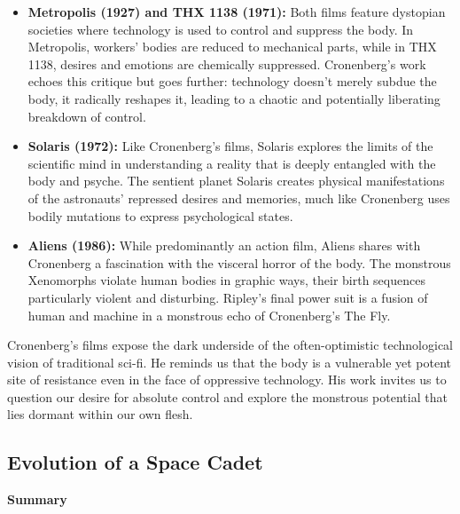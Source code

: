 \documentclass[11pt,fleqn]{book} %
\begin{document}
\begin{itemize}
\item \textbf{Metropolis (1927) and THX 1138 (1971):} Both films feature dystopian societies where technology is used to control and suppress the body. In Metropolis, workers' bodies are reduced to mechanical parts, while in THX 1138, desires and emotions are chemically suppressed. Cronenberg's work echoes this critique but goes further: technology doesn't merely subdue the body, it radically reshapes it, leading to a chaotic and potentially liberating breakdown of control. 

\item \textbf{Solaris (1972):}  Like Cronenberg's films, Solaris explores the limits of the scientific mind in understanding a reality that is deeply entangled with the body and psyche. The sentient planet Solaris creates physical manifestations of the astronauts' repressed desires and memories, much like Cronenberg uses bodily mutations to express psychological states.

\item \textbf{Aliens (1986):}  While predominantly an action film, Aliens shares with Cronenberg a fascination with the visceral horror of the body. The monstrous Xenomorphs violate human bodies in graphic ways, their birth sequences particularly violent and disturbing. Ripley's final power suit is a fusion of human and machine in a monstrous echo of Cronenberg's The Fly.
\end{itemize}

\vspace{5pt}

Cronenberg's films expose the dark underside of the often-optimistic technological vision of traditional sci-fi. He reminds us that the body is a vulnerable yet potent site of resistance even in the face of oppressive technology. His work invites us to question our desire for absolute control and explore the monstrous potential that lies dormant within our own flesh. 



\subsection{Evolution of a Space Cadet}
\textbf{Summary}
\end{document}
